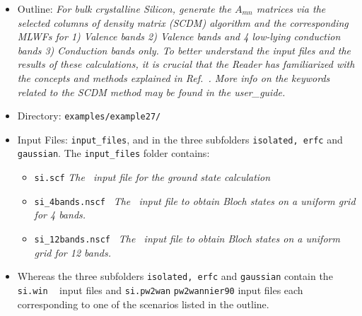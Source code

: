 \documentclass[a4paper,11pt,twoside]{article}
\begin{document}
\begin{itemize}
\item{Outline: \it{For bulk crystalline Silicon, generate the $A_{mn}$ matrices via the selected columns of density matrix (SCDM) algorithm  and the corresponding MLWFs for 1) Valence bands 2) Valence bands and 4 low-lying conduction bands 3) Conduction bands only. To better understand the input files and the results of these calculations, it is crucial that the Reader has familiarized with the concepts and methods explained in Ref.~\cite{LinLin-ArXiv2017}. More info on the keywords related to the SCDM method may be found in the user\_guide.}}
\item{Directory: {\tt examples/example27/}}
\item{Input Files: {\tt input\_files}, and in the three subfolders {\tt isolated, erfc} and {\tt gaussian}. 
The {\tt input\_files} folder contains:}
\begin{itemize}
\item{ {\tt si.scf}  {\it The \pwscf\ input file for the ground state
    calculation}} 
\item{ {\tt si\_4bands.nscf }  {\it The \pwscf\ input file to obtain Bloch
    states on a uniform grid for 4 bands.}}
\item{ {\tt si\_12bands.nscf }  {\it The \pwscf\ input file to obtain Bloch
    states on a uniform grid for 12 bands.}}
\end{itemize}
\item{ Whereas the three subfolders {\tt isolated, erfc} and {\tt gaussian} contain the {\tt si.win} \wannier~ input files and {\tt si.pw2wan} {\tt pw2wannier90} input files each corresponding to one of the scenarios listed in the outline.}
\end{itemize}
\end{document}
